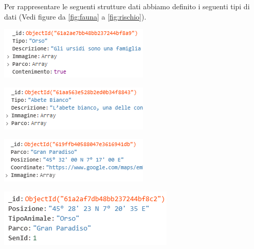 \newpage
Per rappresentare le seguenti strutture dati abbiamo definito i seguenti tipi di dati (Vedi figure da \ref{fig:fauna} a \ref{fig:rischio}).

\begin{multicols}{2}
    \begin{Figure}
        \centering
        \includegraphics{Img/FaunaType.png}
        \label{fig:fauna}
    \end{Figure}
    
    \begin{Figure}
        \centering
        \includegraphics{Img/FloraType.png}
        \label{fig:flora}
    \end{Figure}
    
    \begin{Figure}
        \centering
        \includegraphics{Img/ParcoType.png}
        \label{fig:parco}
    \end{Figure}
    
    \begin{Figure}
        \centering
        \includegraphics{Img/SensoreType.png}
        \label{fig:sensore}
    \end{Figure}
    

\end{multicols}
